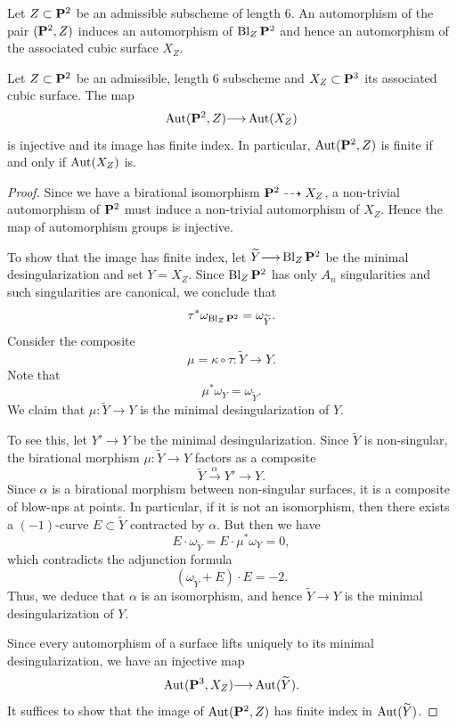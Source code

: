 \documentclass[12pt,reqno]{amsart}
\DeclareMathOperator{\Bl}{Bl}
\renewcommand{\to}{{\longrightarrow}}
\numberwithin{equation}{section}
\begin{document}
Let $Z \subset \P^2$ be an admissible subscheme of length 6.
An automorphism of the pair $(\P^2, Z)$ induces an automorphism of $\Bl_Z\P^2$ and hence an automorphism of the associated cubic surface $X_Z$.

\begin{proposition}
  \label{prop:good} Let $Z \subset \P^2$ be an admissible, length $6$
  subscheme and $X_Z \subset \P^3$ its associated cubic surface.
  The map
  \[ \Aut(\P^2, Z) \to \Aut(X_Z)\]
  is injective and its image has finite index.
  In particular, $\Aut(\P^2, Z)$ is finite if and only if $\Aut(X_Z)$ is.
\end{proposition}

\begin{proof}
  Since we have a birational isomorphism $\P^2 \dashrightarrow X_Z$, a non-trivial automorphism of $\P^2$ must induce a non-trivial automorphism of $X_Z$.
  Hence the map of automorphism groups is injective.

  To show that the image has finite index, let $\widetilde Y \to \Bl_Z\P^2$ be the minimal desingularization and set $Y = X_Z$.
  Since $\Bl_Z\P^2$ has only $A_n$ singularities and such singularities are canonical, we conclude that
  \[\tau^* \omega_{\Bl_Z\P^2} = \omega_{\widetilde Y}.\]
  Consider the composite
  \[\mu = \kappa \circ \tau \colon \widetilde Y \to Y.\]
  Note that
  \[ \mu^* \omega_Y = \omega_{\widetilde Y}.\]
  We claim that $\mu \colon \widetilde Y \to Y$ is the minimal desingularization of $Y$.

  To see this, let $Y' \to Y$ be the minimal desingularization.
  Since $\widetilde Y$ is non-singular, the birational morphism $\mu \colon \widetilde Y \to Y$ factors as a composite
  \[ \widetilde Y \xrightarrow{\alpha} Y' \to Y.\]
  Since $\alpha$ is a birational morphism between non-singular surfaces, it is a composite of blow-ups at points.
  In particular, if it is not an isomorphism, then there exists a $(-1)$-curve $E \subset \widetilde Y$ contracted by $\alpha$.
  But then we have 
  \[ E \cdot \omega_{\widetilde Y} = E \cdot \mu^* \omega_Y = 0,\]
  which contradicts the adjunction formula
  \[ \left(\omega_{\widetilde Y}+ E\right) \cdot E = -2.\]
  Thus, we deduce that $\alpha$ is an isomorphism, and hence $\widetilde Y \to Y$ is the minimal desingularization of $Y$.
  
  Since every automorphism of a surface lifts uniquely to its minimal
  desingularization, we have an injective map
  \[ \Aut(\P^3, X_Z) \to \Aut(\widetilde Y).\]
  It suffices to show that the image of $\Aut(\P^2, Z)$ has finite index in $\Aut(\widetilde Y)$.


\end{proof}
\end{document}
